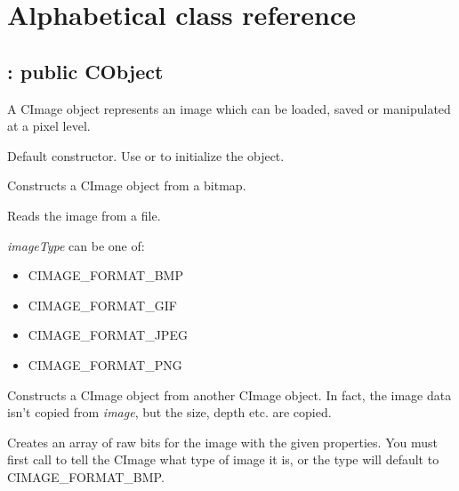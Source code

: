 \chapter{Alphabetical class reference}\label{classref}
%
\setfooter{\thepage}{}{}{}{}{\thepage}%

\section{: public CObject}\label{cimage}


A CImage object represents an image which can be loaded, saved or manipulated
at a pixel level.



Default constructor. Use  or  to initialize
the object.


Constructs a CImage object from a bitmap.


Reads the image from a file.

{\it imageType} can be one of:

\begin{itemize}\itemsep=0pt
\item CIMAGE\_FORMAT\_BMP
\item CIMAGE\_FORMAT\_GIF
\item CIMAGE\_FORMAT\_JPEG
\item CIMAGE\_FORMAT\_PNG
\end{itemize}


Constructs a CImage object from another CImage object. In fact, the image data isn't copied
from {\it image}, but the size, depth etc. are copied.

\label{create}


Creates an array of raw bits for the image with the given properties. You must first call
  to tell the CImage what type of image it is, or
the type will default to CIMAGE\_FORMAT\_BMP.

